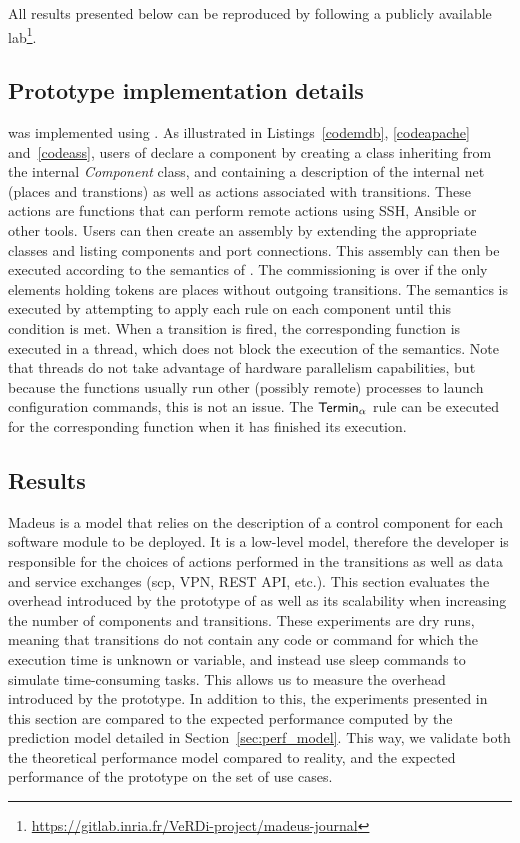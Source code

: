 All results presented below can be reproduced by following a publicly
available
lab\footnote{\url{https://gitlab.inria.fr/VeRDi-project/madeus-journal}}.


\subsection{Prototype implementation details}

\mad was implemented using \python. As illustrated in
Listings~\ref{codemdb}, \ref{codeapache} and~\ref{codeass}, users of
\mad declare a component by creating a class inheriting from the
internal \emph{Component} class, and containing a description of the
internal net (places and transtions) as well as actions associated
with transitions. These actions are \python functions that can perform
remote actions using SSH, Ansible or other tools. Users can then
create an assembly by extending the appropriate classes and listing
components and port connections. This assembly can then be executed
according to the semantics of \mad. The commissioning is over if the
only elements holding tokens are places without outgoing
transitions. The semantics is executed by attempting to apply each
rule on each component until this condition is met. When a
transition is fired, the corresponding \python function is executed in
a thread, which does not block the execution of the
semantics. Note that \python threads do not take advantage of hardware
parallelism capabilities, but because the functions usually run other
(possibly remote) processes to launch configuration commands, this is
not an issue. The $\mathsf{Termin}_\alpha$ rule can be executed for the
corresponding function when it has finished its execution.

\subsection{Results}

Madeus is a model that relies on the description of a control
component for each software module to be deployed. It is a low-level
model, therefore the developer is responsible for the choices of
actions performed in the transitions as well as data and service
exchanges (\eg scp, VPN, REST API, etc.).  This section evaluates the
overhead introduced by the prototype of \mad as well as its
scalability when increasing the number of components and
transitions.
These experiments are dry runs, meaning that transitions do not
contain any code or command for which the execution time is unknown or
variable, and instead use sleep commands to simulate time-consuming
tasks. This allows us to measure the overhead introduced by the
prototype. In addition to this, the experiments presented in this
section are compared to the expected performance computed by the
prediction model detailed in Section~\ref{sec:perf_model}. This way,
we validate both the theoretical performance model compared to
reality, and the expected performance of the prototype on the set of
use cases.

